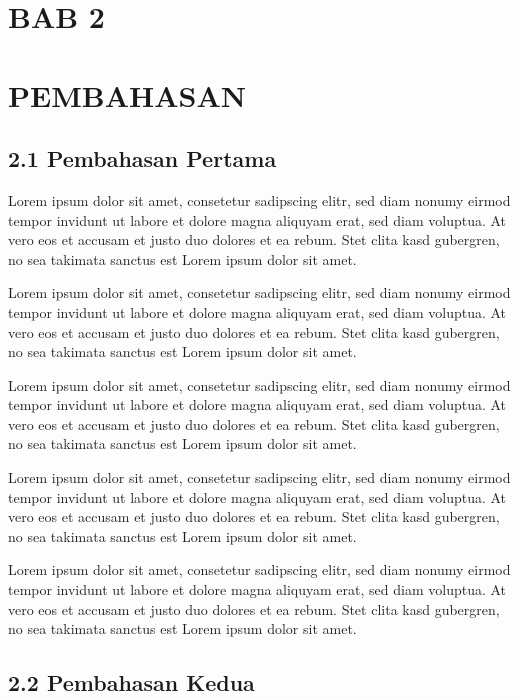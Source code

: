 \begin{center}
\section{BAB 2}
\section{PEMBAHASAN}
\end{center}

\subsection{2.1 Pembahasan Pertama}
Lorem ipsum dolor sit amet, consetetur sadipscing elitr, sed diam nonumy eirmod tempor invidunt ut labore et dolore magna aliquyam erat, sed diam voluptua. At vero eos et accusam et justo duo dolores et ea rebum. Stet clita kasd gubergren, no sea takimata sanctus est Lorem ipsum dolor sit amet.

Lorem ipsum dolor sit amet, consetetur sadipscing elitr, sed diam nonumy eirmod tempor invidunt ut labore et dolore magna aliquyam erat, sed diam voluptua. At vero eos et accusam et justo duo dolores et ea rebum. Stet clita kasd gubergren, no sea takimata sanctus est Lorem ipsum dolor sit amet.

Lorem ipsum dolor sit amet, consetetur sadipscing elitr, sed diam nonumy eirmod tempor invidunt ut labore et dolore magna aliquyam erat, sed diam voluptua. At vero eos et accusam et justo duo dolores et ea rebum. Stet clita kasd gubergren, no sea takimata sanctus est Lorem ipsum dolor sit amet.

Lorem ipsum dolor sit amet, consetetur sadipscing elitr, sed diam nonumy eirmod tempor invidunt ut labore et dolore magna aliquyam erat, sed diam voluptua. At vero eos et accusam et justo duo dolores et ea rebum. Stet clita kasd gubergren, no sea takimata sanctus est Lorem ipsum dolor sit amet.

Lorem ipsum dolor sit amet, consetetur sadipscing elitr, sed diam nonumy eirmod tempor invidunt ut labore et dolore magna aliquyam erat, sed diam voluptua. At vero eos et accusam et justo duo dolores et ea rebum. Stet clita kasd gubergren, no sea takimata sanctus est Lorem ipsum dolor sit amet.


\subsection{2.2 Pembahasan Kedua}

